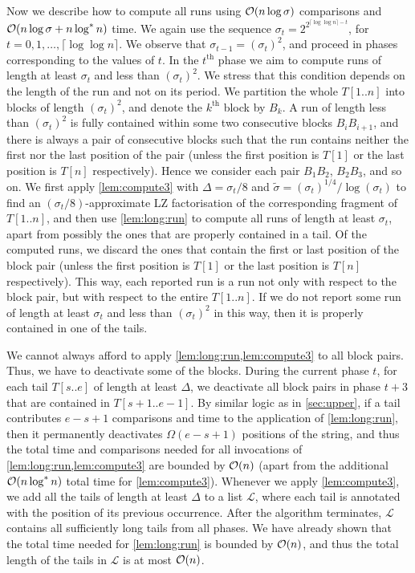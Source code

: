 Now we describe how to compute all runs using $\mathcal{O}(n \log \sigma)$ comparisons and $\mathcal{O}(n \log \sigma + n \log^* n)$ time.
We again use the sequence $\sigma_t=2^{2^{\lceil\log\log n\rceil-t}}$, for $t=0,1,\ldots,\lceil\log\log n\rceil$.
We observe that $\sigma_{t-1}=(\sigma_{t})^{2}$, and proceed in phases corresponding to the values of $t$.
In the $t^{\text{th}}$ phase we aim to compute runs of length at least $\sigma_t$ and less than $(\sigma_t)^2$.
We stress that this condition depends on the length of the run and not on its period.
We partition
the whole $T[1..n]$ into blocks of length $(\sigma_{t})^{2}$, and denote the $k^{\text{th}}$ block by $B_{k}$.
A run of length less than $(\sigma_{t})^{2}$ is fully contained within some two consecutive blocks $B_{i}B_{i+1}$, and there is always a pair of consecutive blocks such that the run contains neither the first nor the last position of the pair (unless the first position is $T[1]$ or the last position is $T[n]$ respectively).
Hence we consider each pair $B_{1}B_{2}$, $B_{2}B_{3}$, and so on.
We first apply \cref{lem:compute3} with $\Delta=\sigma_{t}/8$ and $\tilde{\sigma}=(\sigma_{t})^{1/4}/\log(\sigma_{t})$ to find
an $(\sigma_{t}/8)$-approximate LZ factorisation of the corresponding fragment of $T[1..n]$, and then
use \cref{lem:long:run} to compute all runs of length at least $\sigma_t$, apart from possibly the ones that are properly contained in a tail. Of the computed runs, we discard the ones that contain the first or last position of the block pair (unless the first position is $T[1]$ or the last position is $T[n]$ respectively).
This way, each reported run is a run not only with respect to the block pair, but with respect to the entire $T[1..n]$. If we do not report some run of length at least $\sigma_t$ and less than $(\sigma_t)^2$ in this way, then it is properly contained in one of the tails.

We cannot always afford to apply \cref{lem:long:run,lem:compute3} to all block pairs. Thus, we have to deactivate some of the blocks. During the current phase $t$, for each tail $T[s..e]$ of length at least $\Delta$, we deactivate all block pairs in phase $t + 3$ that are contained in $T[s + 1..e - 1]$. By similar logic as in \cref{sec:upper}, if a tail contributes $e - s + 1$ comparisons and time to the application of \cref{lem:long:run}, then it permanently deactivates $\Omega(e - s + 1)$ positions of the string, and thus the total time and comparisons needed for all invocations of \cref{lem:long:run,lem:compute3} are bounded by $\mathcal{O}(n)$ (apart from the additional $\mathcal{O}(n \log^* n)$ total time for \cref{lem:compute3}).
Whenever we apply \cref{lem:compute3}, we add all the tails of length at least $\Delta$ to a list $\mathcal L$, where each tail is annotated with the position of its previous occurrence.
After the algorithm terminates, $\mathcal L$ contains all sufficiently long tails from all phases. We have already shown that the total time needed for \cref{lem:long:run} is bounded by $\mathcal{O}(n)$, and thus the total length of the tails in $\mathcal L$ is at most $\mathcal{O}(n)$.


